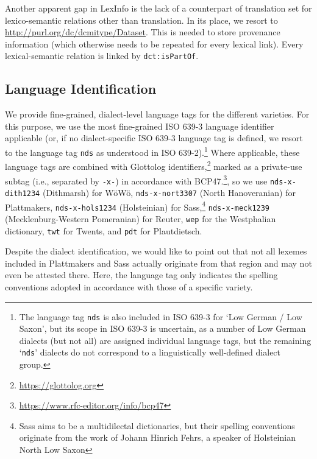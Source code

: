 \documentclass[11pt]{article}
\newcommand{\code}[1]{\texttt{#1}} %
\newcommand{\onto}[1]{\texttt{#1}} %
\begin{document}
Another apparent gap in LexInfo is the lack of a counterpart of translation set for lexico-semantic relations other than translation. In its place, we resort to \url{http://purl.org/dc/dcmitype/Dataset}. This is needed to store provenance information (which otherwise needs to be repeated for every lexical link). Every lexical-semantic relation is linked by \onto{dct:isPartOf}.

\subsection{Language Identification}

We provide fine-grained, dialect-level language tags for the different varieties. For this purpose, we use the most fine-grained ISO 639-3 language identifier applicable (or, if no dialect-specific ISO 639-3 language tag is defined, we resort to the language tag \code{nds} as understood in ISO 639-2).\footnote{
    The language tag \code{nds} is also included in ISO 639-3 for `Low German / Low Saxon', but its scope in ISO 639-3 is uncertain, as a number of Low German dialects (but not all) are assigned individual language tags, but the remaining `\code{nds}' dialects do not correspond to a linguistically well-defined dialect group.
} 
Where applicable, these language tags are combined with Glottolog identifiers,\footnote{\url{https://glottolog.org}} marked as a private-use subtag (i.e., separated by \code{-x-}) in accordance with BCP47.\footnote{\url{https://www.rfc-editor.org/info/bcp47}}, so we use 
\code{nds-x-dith1234} (Dithmarsh) for WöWö,
\code{nds-x-nort3307} (North Hanoveranian) for Plattmakers,
\code{nds-x-hols1234} (Holsteinian) for Sass,\footnote{
    Sass aims to be a multidilectal dictionaries, but their spelling conventions originate from the work of Johann Hinrich Fehrs, a speaker of Holsteinian North Low Saxon
}
\code{nds-x-meck1239} (Mecklenburg-Western Pomeranian) for Reuter,
\code{wep} for the Westphalian dictionary,
\code{twt} for Twents, and
\code{pdt} for Plautdietsch.

Despite the dialect identification, we would like to point out that not all lexemes included in Plattmakers and Sass actually originate from that region and may not even be attested there. Here, the language tag only indicates the spelling conventions adopted in accordance with those of a specific variety.
\end{document}
